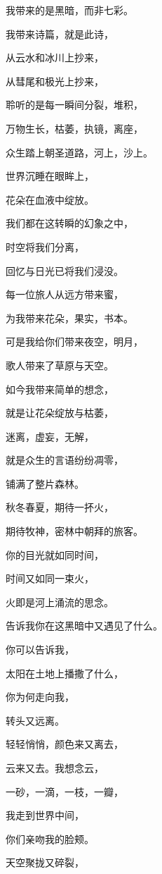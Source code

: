\documentclass[UTF8]{article}
\begin{document}
\par 我带来的是黑暗，而非七彩。
\par 我带来诗篇，就是此诗，
\par 从云水和冰川上抄来，
\par 从彗尾和极光上抄来，
\par 聆听的是每一瞬间分裂，堆积，
\par 万物生长，枯萎，执镜，离座，
\par 众生踏上朝圣道路，河上，沙上。
\par 世界沉睡在眼眸上，
\par 花朵在血液中绽放。
\par 我们都在这转瞬的幻象之中，
\par 时空将我们分离，
\par 回忆与日光已将我们浸没。
\\[0.6cm]
\par 每一位旅人从远方带来蜜，
\par 为我带来花朵，果实，书本。
\par 可是我给你们带来夜空，明月，
\par 歌人带来了草原与天空。
\par 如今我带来简单的想念，
\par 就是让花朵绽放与枯萎，
\par 迷离，虚妄，无解，
\par 就是众生的言语纷纷凋零，
\par 铺满了整片森林。
\par 秋冬春夏，期待一抔火，
\par 期待牧神，密林中朝拜的旅客。
\par 你的目光就如同时间，
\par 时间又如同一束火，
\par 火即是河上涌流的思念。
\par 告诉我你在这黑暗中又遇见了什么。
\par 你可以告诉我，
\par 太阳在土地上播撒了什么，
\par 你为何走向我，
\par 转头又远离。
\\[0.6cm]
\par 轻轻悄悄，颜色来又离去，
\par 云来又去。我想念云，
\par 一砂，一滴，一枝，一瓣，
\par 我走到世界中间，
\par 你们亲吻我的脸颊。
\par 天空聚拢又碎裂，
\end{document}
